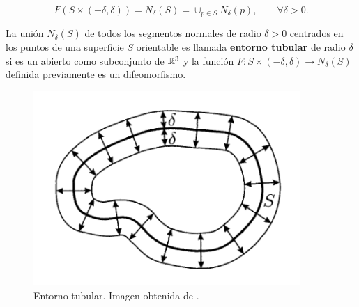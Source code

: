 \begin{equation*}
    F(S \times (-\delta, \delta)) = N_\delta(S)=\cup_{p\in S} N_\delta(p), \qquad \forall \delta > 0.
\end{equation*}

\begin{definition}
La unión $N_\delta(S)$ de todos los segmentos normales de radio $\delta > 0$ centrados en los puntos de una superficie $S$ orientable es llamada \textbf{entorno tubular} de radio $\delta$ si es un abierto como subconjunto de $\mathbb{R}^3$ y la función $F: S \times (-\delta, \delta) \longrightarrow N_\delta(S)$ definida previamente es un difeomorfismo.
\end{definition}

\begin{figure}[h]
  \centering
  \includegraphics[width=0.9\textwidth]{gfx/tubular_neighbourhoods.png}
  \caption{Entorno tubular. Imagen obtenida de \cite{montielrosbook}.}
\end{figure}


